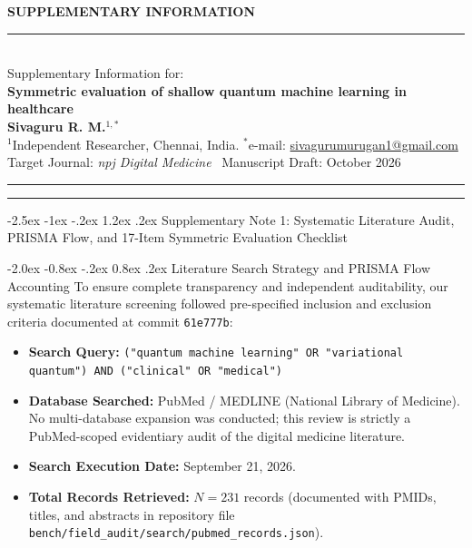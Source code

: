 \documentclass[10pt,a4paper]{article}
\makeatletter
\renewcommand{\section}{\@startsection{section}{1}{\z@}%
  {-2.5ex \@plus -1ex \@minus -.2ex}%
  {1.2ex \@plus.2ex}%
  {\normalfont\Large\sffamily\bfseries\color{naturedark}}}
\renewcommand{\subsection}{\@startsection{subsection}{2}{\z@}%
  {-2.0ex \@plus -0.8ex \@minus -.2ex}%
  {0.8ex \@plus.2ex}%
  {\normalfont\large\sffamily\bfseries\color{naturedark}}}
\makeatother
\begin{document}
 \hfill {\large\textbf{\textsf{SUPPLEMENTARY INFORMATION}}}\\[2pt]
\rule{\textwidth}{1.2pt}\\[8pt]

{\Large\textsf{Supplementary Information for:}}\\[6pt]
{\LARGE\textbf{\textsf{Symmetric evaluation of shallow quantum machine learning in healthcare}}}\\[12pt]

{\large\textbf{\textsf{Sivaguru R. M.}}$^{1,*}$}\\[4pt]
{\footnotesize $^{1}$Independent Researcher, Chennai, India. $^*$e-mail: \href{mailto:sivagurumurugan1@gmail.com}{sivagurumurugan1@gmail.com}}\\[6pt]
{\footnotesize Target Journal: \textit{npj Digital Medicine} \textbar\ Manuscript Draft: October 2026}\\[14pt]
\rule{\textwidth}{0.4pt}

\vspace{10pt}
\tableofcontents
\vspace{14pt}
\rule{\textwidth}{0.4pt}
\newpage

\section{Supplementary Note 1: Systematic Literature Audit, PRISMA Flow, and 17-Item Symmetric Evaluation Checklist}

\subsection{Literature Search Strategy and PRISMA Flow Accounting}
To ensure complete transparency and independent auditability, our systematic literature screening followed pre-specified inclusion and exclusion criteria documented at commit \texttt{61e777b}:
\begin{itemize}
  \setlength{\itemsep}{1pt}
  \item \textbf{Search Query:} \texttt{("quantum machine learning" OR "variational quantum") AND ("clinical" OR "medical")}
  \item \textbf{Database Searched:} PubMed / MEDLINE (National Library of Medicine). No multi-database expansion was conducted; this review is strictly a PubMed-scoped evidentiary audit of the digital medicine literature.
  \item \textbf{Search Execution Date:} September 21, 2026.
  \item \textbf{Total Records Retrieved:} $N = 231$ records (documented with PMIDs, titles, and abstracts in repository file \texttt{bench/field\_audit/search/pubmed\_records.json}).
\end{itemize}
\end{document}
